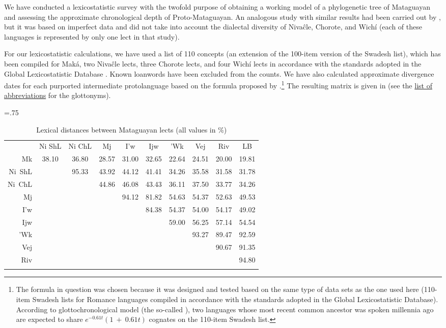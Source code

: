 We have conducted a lexicostatistic survey with the twofold purpose of obtaining a working model of a phylogenetic tree of Mataguayan and assessing the approximate chronological depth of Proto-Mataguayan. An analogous study with similar results had been carried out by \citet{AT64}, but it was based on imperfect data and did not take into account the dialectal diversity of Nivaĉle, Chorote, and Wichí (each of these languages is represented by only one lect in that study).

For our lexicostatistic calculations, we have used a list of 110 concepts (an extension of the 100-item version of the Swadesh list), which has been compiled for Maká, two Nivaĉle lects, three Chorote lects, and four Wichí lects \citep{GLD-mtg} in accordance with the standards adopted in the Global Lexicostatistic Database \citep{GLD}. Known loanwords have been excluded from the counts. We have also calculated approximate divergence dates for each purported intermediate protolanguage based on the formula proposed by \citet{MV-MS-17}.\footnote{The formula in question was chosen because it was designed and tested based on the same type of data sets as the one used here (110-item Swadesh lists for Romance languages compiled in accordance with the standards adopted in the Global Lexicostatistic Database). According to  glottochronological model (the so-called ), two languages whose most recent common ancestor was spoken  millennia ago are expected to share \(e^{-0.61t}(1~+~0.61t)\) cognates on the 110-item Swadesh list.} The resulting matrix is given in  (see the \hyperref[abbr]{list of abbreviations} for the glottonyms).

\begin{table}
\tabcolsep=.75\tabcolsep
\caption{Lexical distances between Mataguayan lects (all values in \%)}\label{matrix}
\begin{tabularx}{\textwidth}{r cc ccc cccc}
    \lsptoprule
    & Ni ShL & Ni ChL & Mj & I’w & Ijw & ’Wk & Vej & Riv & LB\\\cmidrule(lr){2-3}\cmidrule(lr){4-6}\cmidrule(lr){7-10}
    Mk & 38.10 & 36.80 & 28.57 & 31.00 & 32.65 & 22.64 & 24.51 & 20.00 & 19.81\\\addlinespace
    Ni~ShL & & 95.33 & 43.92 & 44.12 & 41.41 & 34.26 & 35.58 & 31.58 & 31.78\\
    Ni~ChL & & & 44.86 & 46.08 & 43.43 & 36.11 & 37.50 & 33.77 & 34.26\\\addlinespace
    Mj & & & & 94.12 & 81.82 & 54.63 & 54.37 & 52.63 & 49.53\\
    I’w & & & & & 84.38 & 54.37 & 54.00 & 54.17 & 49.02\\
    Ijw & & & & & & 59.00 & 56.25 & 57.14 & 54.54\\\addlinespace
    ’Wk & & & & & & & 93.27 & 89.47 & 92.59\\
    Vej & & & & & & & & 90.67 & 91.35\\
    Riv & & & & & & & & & 94.80\\
    \lspbottomrule
\end{tabularx}
\end{table}

